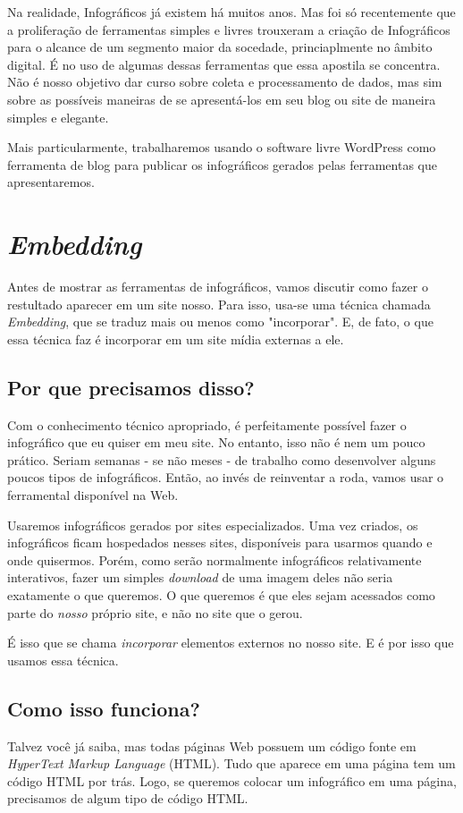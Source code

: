 \documentclass[12pt,onecolumn]{article}
\begin{document}
  Na realidade, Infográficos já existem há muitos anos. Mas foi só recentemente
  que a proliferação de ferramentas simples e livres trouxeram a criação de
  Infográficos para o alcance de um segmento maior da socedade, princiaplmente
  no âmbito digital. É no uso de algumas dessas ferramentas que essa apostila se
  concentra. Não é nosso objetivo dar curso sobre coleta e processamento de
  dados, mas sim sobre as possíveis maneiras de se apresentá-los em seu blog ou
  site de maneira simples e elegante.
  
  Mais particularmente, trabalharemos usando o software livre WordPress como
  ferramenta de blog para publicar os infográficos gerados pelas ferramentas que
  apresentaremos.

\clearpage
\section{\textit{Embedding}}
  Antes de mostrar as ferramentas de infográficos, vamos discutir como fazer
  o restultado aparecer em um site nosso. Para isso, usa-se uma técnica chamada
  \textit{Embedding}, que se traduz mais ou menos como "incorporar". E, de fato,
  o que essa técnica faz é incorporar em um site mídia externas a ele.
  
  \subsection{Por que precisamos disso?}
    Com o conhecimento técnico apropriado, é perfeitamente possível fazer o
    infográfico que eu quiser em meu site. No entanto, isso não é nem um pouco
    prático. Seriam semanas - se não meses - de trabalho como desenvolver alguns
    poucos tipos de infográficos. Então, ao invés de reinventar a roda, vamos
    usar o ferramental disponível na Web.

    Usaremos infográficos gerados por sites especializados. Uma vez criados, os
    infográficos ficam hospedados nesses sites, disponíveis para usarmos quando
    e onde quisermos. Porém, como serão normalmente infográficos relativamente
    interativos, fazer um simples \textit{download} de uma imagem deles não
    seria exatamente o que queremos. O que queremos é que eles sejam acessados
    como parte do \emph{nosso} próprio site, e não no site que o gerou.
    
    É isso que se chama \emph{incorporar} elementos externos no nosso site. E é
    por isso que usamos essa técnica.
  \subsection{Como isso funciona?}
    Talvez você já saiba, mas todas páginas Web possuem um código fonte em
    \emph{HyperText Markup Language} (HTML). Tudo que aparece em uma página
    tem um código HTML por trás. Logo, se queremos colocar um infográfico em
    uma página, precisamos de algum tipo de código HTML.
    
\end{document}
